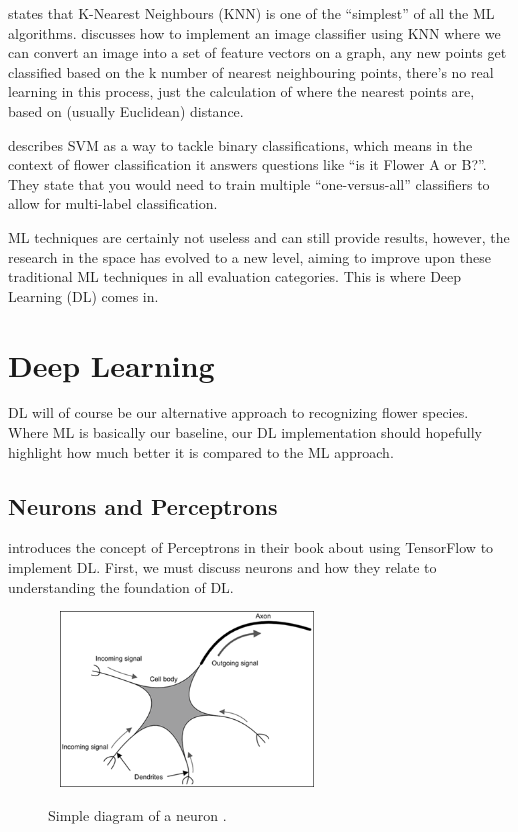 \documentclass[12pt,a4paper]{report}
\begin{document}
\citet{MohammedMohssen2017Ml:a} states that K-Nearest Neighbours (KNN) is one of the “simplest” of  all the 
ML algorithms. \citet{rosebook2016} discusses how to implement an image classifier using KNN where we can 
convert an image into a set of feature vectors on a graph, any new points get classified based on the k number of 
nearest neighbouring points, there's no real learning in this process, just the calculation of where the nearest points 
are, based on (usually Euclidean) distance.

\par

\citet{NobleWilliamS2006Wias} describes SVM as a way to tackle binary classifications, which means in the 
context of flower classification it answers questions like “is it Flower A or B?”. They state that you would need
to train multiple “one-versus-all” classifiers to allow for multi-label classification.

\par

ML techniques are certainly not useless and can still provide results, however, the research in the space has evolved 
to a new level, aiming to improve upon these traditional ML techniques in all evaluation categories. This is where Deep
Learning (DL) comes in.

\section{Deep Learning}

DL will of course be our alternative approach to recognizing flower species. Where ML is basically our baseline, our DL 
implementation should hopefully highlight how much better it is compared to the ML approach.

\subsection{Neurons and Perceptrons}

\citet{ScarpinoMatthew2018Tfd} introduces the concept of Perceptrons in their book about using TensorFlow 
to implement DL. First, we must discuss neurons and how they relate to understanding the foundation of DL.

\begin{figure}[h]\
    \centering
    \includegraphics[width=0.6\textwidth]{neuron.png}
    \caption{Simple diagram of a neuron \citep{ScarpinoMatthew2018Tfd}.}
\end{figure}
\end{document}
